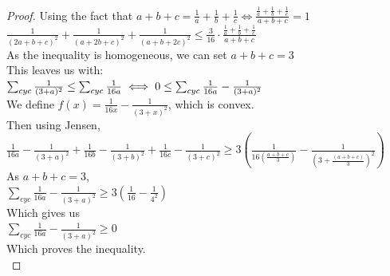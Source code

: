 \begin{proof}
    Using the fact that $a + b + c = \frac{1}{a}+\frac{1}{b}+\frac{1}{c} \iff \frac{\frac{1}{a}+\frac{1}{b}+\frac{1}{c}}{a + b + c} = 1$\\
    $\frac{1}{(2a+b+c)^2}+\frac{1}{(a+2b+c)^2}+\frac{1}{(a+b+2c)^2} \leq \frac{3}{16} \cdot \frac{\frac{1}{a}+\frac{1}{b}+\frac{1}{c}}{a + b + c}$\\
    As the inequality is homogeneous, we can set $a+b+c=3$\\
    This leaves us with:\\
    $\sum_{cyc} \frac{1}{(3+a)^2} \leq \sum_{cyc} \frac{1}{16a}\\
    \iff 0 \leq \sum_{cyc} \frac{1}{16a}-\frac{1}{(3+a)^2}$\\
    We define $f(x)=\frac{1}{16x}-\frac{1}{(3+x)^2}$, which is convex.\\
    Then using Jensen, $\frac{1}{16a}-\frac{1}{(3+a)^2}+\frac{1}{16b}-\frac{1}{(3+b)^2}+\frac{1}{16c}-\frac{1}{(3+c)^2} \geq 3(\frac{1}{16(\frac{a+b+c}{3})}-\frac{1}{(3+\frac{(a+b+c)}{3})^2})$\\
    As $a+b+c=3$,\\
    $\sum_{cyc} \frac{1}{16a}-\frac{1}{(3+a)^2} \geq 3(\frac{1}{16}-\frac{1}{4^2})$\\
    Which gives us\\
    $\sum_{cyc} \frac{1}{16a}-\frac{1}{(3+a)^2} \geq 0$\\
    Which proves the inequality.\\
\end{proof}
